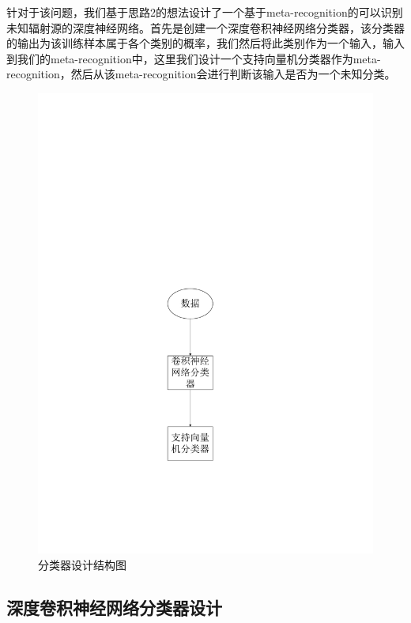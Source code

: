 针对于该问题，我们基于思路2的想法设计了一个基于meta-recognition的可以识别未知辐射源的深度神经网络。首先是创建一个深度卷积神经网络分类器，该分类器的输出为该训练样本属于各个类别的概率，我们然后将此类别作为一个输入，输入到我们的meta-recognition中，这里我们设计一个支持向量机分类器作为meta-recognition，然后从该meta-recognition会进行判断该输入是否为一个未知分类。

\begin{figure}
	\centering
	\includegraphics{figures/frame.pdf}
	\caption{分类器设计结构图}
\end{figure}


\subsection{深度卷积神经网络分类器设计}

